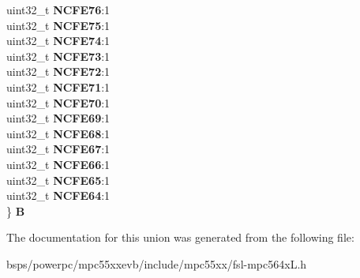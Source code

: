 \begin{DoxyCompactItemize}
\begin{tabbing}
\>uint32\_t {\bfseries NCFE76}:1\\
\>uint32\_t {\bfseries NCFE75}:1\\
\>uint32\_t {\bfseries NCFE74}:1\\
\>uint32\_t {\bfseries NCFE73}:1\\
\>uint32\_t {\bfseries NCFE72}:1\\
\>uint32\_t {\bfseries NCFE71}:1\\
\>uint32\_t {\bfseries NCFE70}:1\\
\>uint32\_t {\bfseries NCFE69}:1\\
\>uint32\_t {\bfseries NCFE68}:1\\
\>uint32\_t {\bfseries NCFE67}:1\\
\>uint32\_t {\bfseries NCFE66}:1\\
\>uint32\_t {\bfseries NCFE65}:1\\
\>uint32\_t {\bfseries NCFE64}:1\\
\} {\bfseries B}\\

\end{tabbing}\end{DoxyCompactItemize}


The documentation for this union was generated from the following file\+:\begin{DoxyCompactItemize}
\item 
bsps/powerpc/mpc55xxevb/include/mpc55xx/fsl-\/mpc564x\+L.\+h\end{DoxyCompactItemize}
